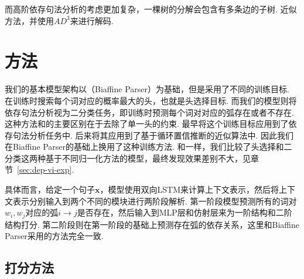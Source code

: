 而高阶依存句法分析的考虑更加复杂，一棵树的分解会包含有多条边的子树.
近似方法\cite{smith-eisner-2008-dependency,gormley-etal-2015-approximation}，并使用$AD^3$\cite{martins-etal-2011-dual,martins-etal-2013-turning}来进行解码.

\section{方法}\label{sec:dep-vi-approach}

我们的基本模型架构以\cite{dozat-etal-2017-biaffine}（Biaffine Parser）为基础，但是采用了不同的训练目标.
\cite{dozat-etal-2017-biaffine}在训练时搜索每个词对应的概率最大的头，也就是头选择目标\cite{zhang-etal-2017-head}.
而我们的模型则将依存句法分析视为二分类任务，即训练时预测每个词对对应的弧存在或者不存在.
这种方法和\cite{dozat-etal-2017-biaffine}的主要区别在于去除了单一头的约束.
\cite{eisner-1996-three}最早将这个训练目标应用到了依存句法分析任务中.
\cite{smith-eisner-2008-dependency}后来将其应用到了基于循环置信推断的近似算法中.
因此我们在Biaffine Parser的基础上换用了这种训练方法.
和\cite{zhang-etal-2019-empirical}一样，我们比较了头选择和二分类这两种基于不同归一化方法的模型，最终发现效果差别不大，见章节~\ref{sec:dep-vi-exp}.

具体而言，给定一个句子$\boldsymbol{x}$，模型使用双向LSTM来计算上下文表示，然后将上下文表示分别输入到两个不同的模块进行两阶段解析.
第一阶段模型预测所有的词对$w_i,w_j$对应的弧$i\rightarrow j$是否存在，然后输入到MLP层和仿射层来为一阶结构和二阶结构打分.
第二阶段则在第一阶段的基础上预测存在弧的依存关系，这里和Biaffine Parser采用的方法完全一致.


\subsection{打分方法}

